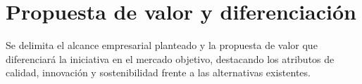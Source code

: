 \section{Propuesta de valor y diferenciación}
\label{sec:propuesta_valor}

Se delimita el alcance empresarial planteado y la propuesta de valor que diferenciará la iniciativa en el mercado objetivo, destacando los atributos de calidad, innovación y sostenibilidad frente a las alternativas existentes.
